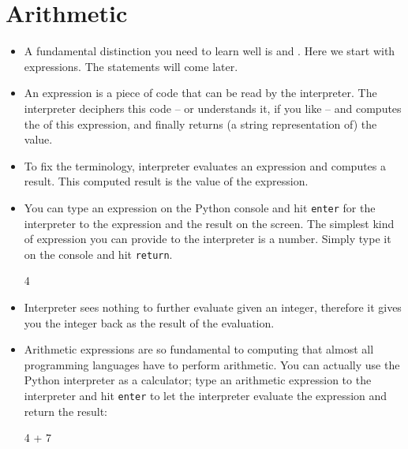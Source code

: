 \documentclass[a4paper]{article}
\begin{document}
\section{Arithmetic}

\begin{itemize}
\item A fundamental distinction you need to learn well is
 and . Here we start with expressions. The
statements will come later.

\item An expression is a piece of code that can be read by the interpreter. The
interpreter deciphers this code -- or understands it, if you like -- and
computes the  of this expression, and finally returns (a string
representation of) the value.

\item To fix the terminology, interpreter evaluates an expression and computes a
result. This computed result is the value of the expression.

\item You can type an expression on the Python console and hit \Verb+enter+ for the
interpreter to  the expression and  the result on the
screen. The simplest kind of expression you can provide to the interpreter is a
number. Simply type it on the console and hit \Verb+return+.

\begin{ucodeframe}
\begin{pyconsole}
4
\end{pyconsole}
\end{ucodeframe}

\item Interpreter sees nothing to further evaluate given an integer, therefore
it gives you the integer back as the result of the evaluation.

\item Arithmetic expressions are so fundamental to computing that almost all
programming languages have  to perform arithmetic. You can
actually use the Python interpreter as a calculator; type an arithmetic
expression to the interpreter and hit \Verb+enter+ to let the interpreter evaluate
the expression and return the result:

\begin{ucodeframe}
\begin{pyconsole}
4 + 7
\end{pyconsole}
\end{ucodeframe}


\end{itemize}
\end{document}
